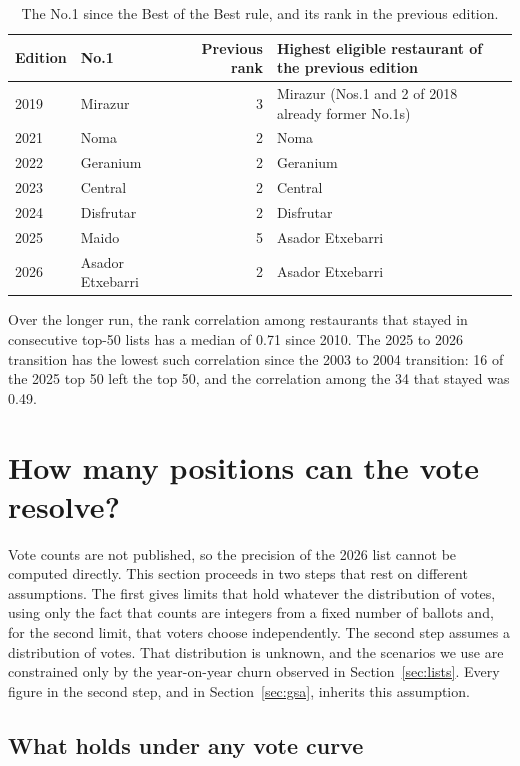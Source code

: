 \documentclass[11pt,a4paper]{article}
\begin{document}
\begin{table}[t]
\caption{The No.1 since the Best of the Best rule, and its rank in the previous edition.}
\label{tab:succession}
\small
\begin{tabular*}{\textwidth}{@{\extracolsep{\fill}}llrl@{}}
\toprule
Edition & No.1 & Previous rank & Highest eligible restaurant of the previous edition \\
\midrule
2019 & Mirazur & 3 & Mirazur (Nos.1 and 2 of 2018 already former No.1s) \\
2021 & Noma & 2 & Noma \\
2022 & Geranium & 2 & Geranium \\
2023 & Central & 2 & Central \\
2024 & Disfrutar & 2 & Disfrutar \\
2025 & Maido & 5 & Asador Etxebarri \\
2026 & Asador Etxebarri & 2 & Asador Etxebarri \\
\bottomrule
\end{tabular*}
\end{table}

Over the longer run, the rank correlation among restaurants that stayed in consecutive top-50 lists has a median of 0.71 since 2010. The 2025 to 2026 transition has the lowest such correlation since the 2003 to 2004 transition: 16 of the 2025 top 50 left the top 50, and the correlation among the 34 that stayed was 0.49.

\section{How many positions can the vote resolve?}\label{sec:noise}

Vote counts are not published, so the precision of the 2026 list cannot be computed directly. This section proceeds in two steps that rest on different assumptions. The first gives limits that hold whatever the distribution of votes, using only the fact that counts are integers from a fixed number of ballots and, for the second limit, that voters choose independently. The second step assumes a distribution of votes. That distribution is unknown, and the scenarios we use are constrained only by the year-on-year churn observed in Section~\ref{sec:lists}. Every figure in the second step, and in Section~\ref{sec:gsa}, inherits this assumption.

\subsection{What holds under any vote curve}\label{sec:bounds}
\end{document}
